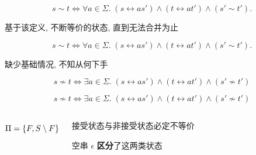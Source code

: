 \begin{frame}{}
  \begin{center}
    \[
      s \sim t \iff \forall a \in \Sigma.\; 
        (s \rel{a} s') \land (t \rel{a} t') \land (s' \sim t').
    \]

    基于该定义, 不断等价的状态, 直到无法合并为止

    \pause
    \vspace{0.80cm}

    \pause
    \vspace{0.80cm}

    \pause
    \vspace{0.50cm}
  \end{center}
\end{frame}

\begin{frame}{}
  \begin{center}
    \[
      s \sim t \iff \forall a \in \Sigma.\; 
        (s \rel{a} s') \land (t \rel{a} t') \land (s' \sim t').
    \]

    缺少基础情况, 不知从何下手

    \pause
    \[
      s \nsim t \iff \exists a \in \Sigma.\;
        (s \rel{a} s') \land (t \rel{a} t') \land (s' \nsim t')
    \]

    \pause
  \end{center}

\end{frame}

\begin{frame}{}
  \begin{center}
    \[
      s \nsim t \iff \exists a \in \Sigma.\;
        (s \rel{a} s') \land (t \rel{a} t') \land (s' \nsim t')
    \]

    \pause
    \vspace{0.30cm}
  \end{center}

  \begin{columns}
      \[
        \Pi = \{F, S \setminus F\}
      \]

      \vspace{0.30cm}
      \begin{center}
        接受状态与非接受状态必定不等价

        \pause
        \vspace{0.50cm}
        空串 $\epsilon$ {\bf 区分}了这两类状态
      \end{center}
  \end{columns}
\end{frame}

